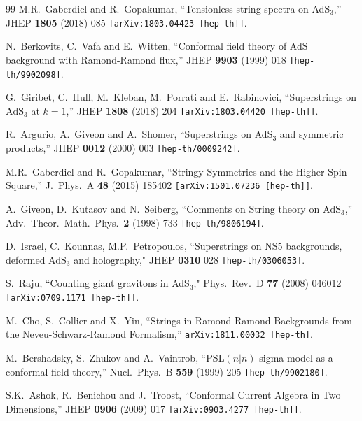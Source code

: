 \documentclass[12pt,a4paper]{article}
\begin{document}
\begin{thebibliography}{99}
M.R.~Gaberdiel and R.~Gopakumar,
``Tensionless string spectra on AdS$_{3}$,''
JHEP {\bf 1805} (2018) 085
{\tt  [arXiv:1803.04423 [hep-th]]}.

N.~Berkovits, C.~Vafa and E.~Witten,
``Conformal field theory of AdS background with Ramond-Ramond flux,''
JHEP {\bf 9903} (1999) 018
{\tt [hep-th/9902098]}.

G.~Giribet, C.~Hull, M.~Kleban, M.~Porrati and E.~Rabinovici,
``Superstrings on $\mathrm{AdS}_{3}$ at $k=1$,''
JHEP {\bf 1808} (2018) 204
{\tt [arXiv:1803.04420 [hep-th]]}.

R.~Argurio, A.~Giveon and A.~Shomer,
``Superstrings on AdS$_3$ and symmetric products,''
JHEP {\bf 0012} (2000) 003
{\tt [hep-th/0009242]}.

M.R.~Gaberdiel and R.~Gopakumar,
``Stringy Symmetries and the Higher Spin Square,''
J.\ Phys.\ A {\bf 48} (2015)   185402
{\tt [arXiv:1501.07236 [hep-th]]}. 

A.~Giveon, D.~Kutasov and N.~Seiberg,
 ``Comments on String theory on $\mathrm{AdS}_3$,''
Adv.\ Theor.\ Math.\ Phys.\  {\bf 2} (1998) 733
{\tt [hep-th/9806194]}.

D.~Israel, C.~Kounnas, M.P.~Petropoulos,
``Superstrings on NS5 backgrounds, deformed AdS$_3$ and holography,"
JHEP {\bf 0310} 028 
{\tt  [hep-th/0306053]}.
 
S.~Raju, 
``Counting giant gravitons in AdS$_3$,"
Phys.\ Rev.\ D {\bf 77} (2008) 046012
{\tt [arXiv:0709.1171 [hep-th]]}. 


M.~Cho, S.~Collier and X.~Yin,
``Strings in Ramond-Ramond Backgrounds from the Neveu-Schwarz-Ramond Formalism,''
{\tt arXiv:1811.00032 [hep-th]}.

M.~Bershadsky, S.~Zhukov and A.~Vaintrob,
``PSL$(n|n)$ sigma model as a conformal field theory,''
Nucl.\ Phys.\ B {\bf 559} (1999) 205
{\tt [hep-th/9902180]}.
  
S.K.~Ashok, R.~Benichou and J.~Troost,
``Conformal Current Algebra in Two Dimensions,''
JHEP {\bf 0906} (2009) 017
{\tt [arXiv:0903.4277 [hep-th]]}.  


\end{thebibliography}
\end{document}
